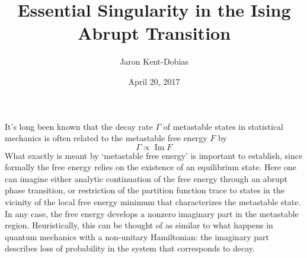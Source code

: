 \documentclass[fleqn]{article}
\title{Essential Singularity in the Ising Abrupt Transition}
\author{Jaron Kent-Dobias}
\date{April 20, 2017}
\begin{document}
\def\[{\begin{equation}}
\def\]{\end{equation}}

\def\im{\mathop{\mathrm{Im}}\nolimits}
\def\dd{\mathrm d}
\def\O{\mathcal O}
\def\ei{\mathop{\mathrm{Ei}}\nolimits}
\def\b{\mathrm b}

\newcommand\pd[3][]{
  \ifthenelse{\isempty{#1}}
    {\def\tmp{}}
    {\def\tmp{^#1}}
  \frac{\partial\tmp#2}{\partial#3\tmp}
}

\maketitle

It's long been known that the decay rate $\Gamma$ of metastable states in
statistical mechanics is often related to the metastable free energy $F$ by
\cite{langer.1967.condensation,langer.1969.metastable,gaveau.1989.analytic}
\[
  \Gamma\propto\im F
\]
What exactly is meant by `metastable free energy' is important to establish,
since formally the free energy relies on the existence of an equilibrium
state. Here one can imagine either analytic continuation of the free energy
through an abrupt phase transition, or restriction of the partition function
trace to states in the vicinity of the local free energy minimum that
characterizes the metastable state. In any case, the free energy develops a
nonzero imaginary part in the metastable region. Heuristically, this can be
thought of as similar to what happens in quantum mechanics with a non-unitary
Hamiltonian: the imaginary part describes loss of probability in the system
that corresponds to decay. 
\end{document}
